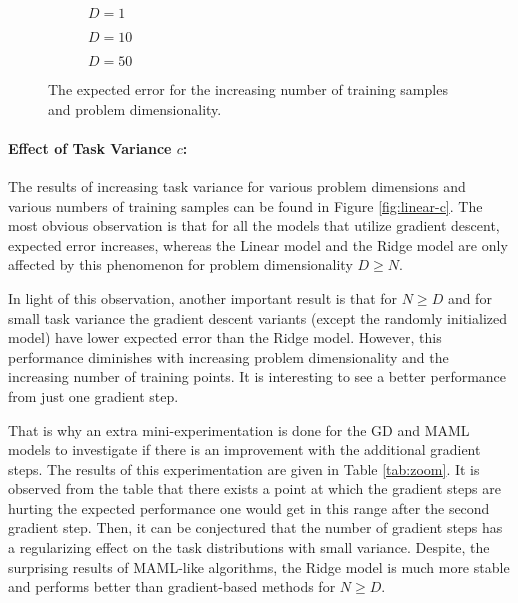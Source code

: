 \begin{figure}[!h]
  \centering
    \begin{subfigure}{0.32\textwidth}
      \centering
      \caption{$D=1$}
      \label{fig:linear-N-D-1}
    \end{subfigure}
    \begin{subfigure}{0.32\textwidth}
      \centering
      \caption{$D=10$}
      \label{fig:linear-N-D-10}
    \end{subfigure}
    \begin{subfigure}{0.32\textwidth}
      \centering
      \caption{$D=50$}
      \label{fig:linear-N-D-50}
    \end{subfigure}
  \caption{The expected error for the increasing number of training samples and problem dimensionality.}\label{fig:linear-N}
\end{figure}


\paragraph{Effect of Task Variance $c$:} The results of increasing task variance for various problem dimensions and various numbers of training samples can be found in Figure \ref{fig:linear-c}. The most obvious observation is that for all the models that utilize gradient descent, expected error increases, whereas the Linear model and the Ridge model are only affected by this phenomenon for problem dimensionality $D\geq N$.

In light of this observation, another important result is that for $N\geq D$ and for small task variance the gradient descent variants (except the randomly initialized model) have lower expected error than the Ridge model. However, this performance diminishes with increasing problem dimensionality and the increasing number of training points. It is interesting to see a better performance from just one gradient step. 

That is why an extra mini-experimentation is done for the GD and MAML models to investigate if there is an improvement with the additional gradient steps. The results of this experimentation are given in Table \ref{tab:zoom}. It is observed from the table that there exists a point at which the gradient steps are hurting the expected performance one would get in this range after the second gradient step. Then, it can be conjectured that the number of gradient steps has a regularizing effect on the task distributions with small variance. Despite, the surprising results of MAML-like algorithms, the Ridge model is much more stable and performs better than gradient-based methods for $N\geq D$.

